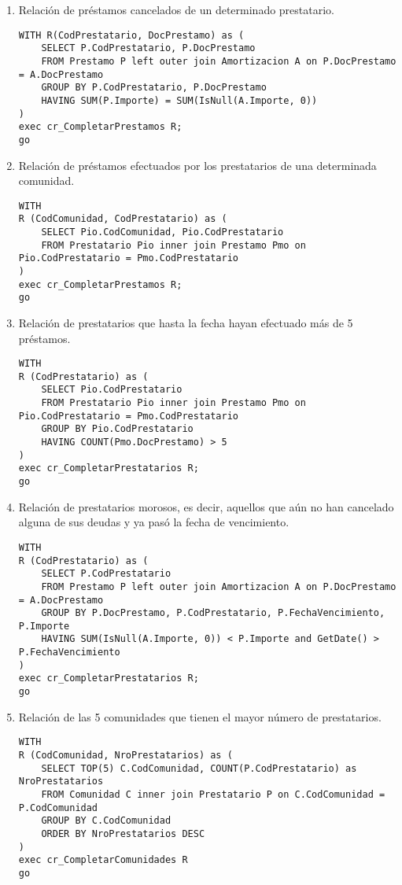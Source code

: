 \begin{enumerate}
\item Relación de préstamos cancelados de un determinado prestatario.
\begin{verbatim}
WITH R(CodPrestatario, DocPrestamo) as (
    SELECT P.CodPrestatario, P.DocPrestamo
    FROM Prestamo P left outer join Amortizacion A on P.DocPrestamo = A.DocPrestamo
    GROUP BY P.CodPrestatario, P.DocPrestamo
    HAVING SUM(P.Importe) = SUM(IsNull(A.Importe, 0))
)
exec cr_CompletarPrestamos R;
go
\end{verbatim}

\item Relación de préstamos efectuados por los prestatarios de una determinada
comunidad.
\begin{verbatim}
WITH
R (CodComunidad, CodPrestatario) as (
    SELECT Pio.CodComunidad, Pio.CodPrestatario
    FROM Prestatario Pio inner join Prestamo Pmo on Pio.CodPrestatario = Pmo.CodPrestatario
)
exec cr_CompletarPrestamos R;
go
\end{verbatim}

\item Relación de prestatarios que hasta la fecha hayan efectuado más de 5
préstamos.
\begin{verbatim}
WITH
R (CodPrestatario) as (
    SELECT Pio.CodPrestatario
    FROM Prestatario Pio inner join Prestamo Pmo on Pio.CodPrestatario = Pmo.CodPrestatario
    GROUP BY Pio.CodPrestatario
    HAVING COUNT(Pmo.DocPrestamo) > 5
)
exec cr_CompletarPrestatarios R;
go
\end{verbatim}

\item Relación de prestatarios morosos, es decir, aquellos que aún no han
cancelado alguna de sus deudas y ya pasó la fecha de vencimiento.
\begin{verbatim}
WITH
R (CodPrestatario) as (
    SELECT P.CodPrestatario
    FROM Prestamo P left outer join Amortizacion A on P.DocPrestamo = A.DocPrestamo
    GROUP BY P.DocPrestamo, P.CodPrestatario, P.FechaVencimiento, P.Importe
    HAVING SUM(IsNull(A.Importe, 0)) < P.Importe and GetDate() > P.FechaVencimiento
)
exec cr_CompletarPrestatarios R;
go
\end{verbatim}

\item Relación de las 5 comunidades que tienen el mayor número de prestatarios.
\begin{verbatim}
WITH
R (CodComunidad, NroPrestatarios) as (
    SELECT TOP(5) C.CodComunidad, COUNT(P.CodPrestatario) as NroPrestatarios
    FROM Comunidad C inner join Prestatario P on C.CodComunidad = P.CodComunidad
    GROUP BY C.CodComunidad
    ORDER BY NroPrestatarios DESC
)
exec cr_CompletarComunidades R
go
\end{verbatim}


\end{enumerate}
